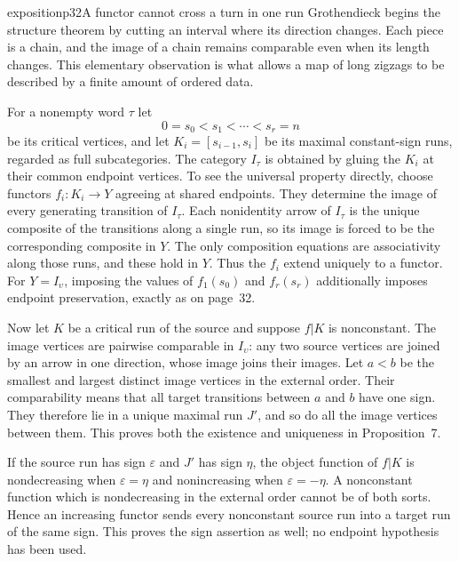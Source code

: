 \begin{dcomment}{exposition}{p32}{A functor cannot cross a turn in one run}
Grothendieck begins the structure theorem by cutting an interval where its direction changes. Each piece is a chain, and the image of a chain remains comparable even when its length changes. This elementary observation is what allows a map of long zigzags to be described by a finite amount of ordered data.

For a nonempty word $\tau$ let
\[
 0=s_0<s_1<\cdots<s_r=n
\]
be its critical vertices, and let $K_i=[s_{i-1},s_i]$ be its maximal constant-sign runs, regarded as full subcategories. The category $I_\tau$ is obtained by gluing the $K_i$ at their common endpoint vertices. To see the universal property directly, choose functors $f_i:K_i\to Y$ agreeing at shared endpoints. They determine the image of every generating transition of $I_\tau$. Each nonidentity arrow of $I_\tau$ is the unique composite of the transitions along a single run, so its image is forced to be the corresponding composite in $Y$. The only composition equations are associativity along those runs, and these hold in $Y$. Thus the $f_i$ extend uniquely to a functor. For $Y=I_{\upsilon}$, imposing the values of $f_1(s_0)$ and $f_r(s_r)$ additionally imposes endpoint preservation, exactly as on page~32.

Now let $K$ be a critical run of the source and suppose $f|K$ is nonconstant. The image vertices are pairwise comparable in $I_{\upsilon}$: any two source vertices are joined by an arrow in one direction, whose image joins their images. Let $a<b$ be the smallest and largest distinct image vertices in the external order. Their comparability means that all target transitions between $a$ and $b$ have one sign. They therefore lie in a unique maximal run $J'$, and so do all the image vertices between them. This proves both the existence and uniqueness in Proposition~7.

If the source run has sign $\varepsilon$ and $J'$ has sign $\eta$, the object function of $f|K$ is nondecreasing when $\varepsilon=\eta$ and nonincreasing when $\varepsilon=-\eta$. A nonconstant function which is nondecreasing in the external order cannot be of both sorts. Hence an increasing functor sends every nonconstant source run into a target run of the same sign. This proves the sign assertion as well; no endpoint hypothesis has been used.


\end{dcomment}
